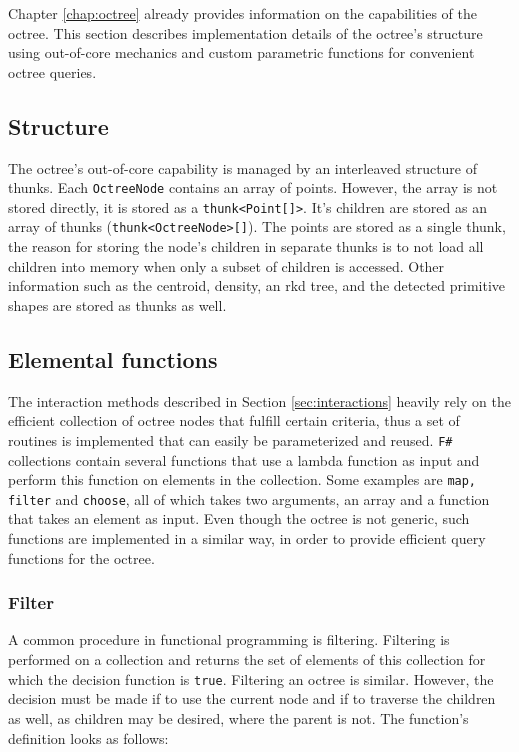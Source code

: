 Chapter \ref{chap:octree} already provides information on the capabilities of the octree. This section describes implementation details of the octree's structure using out-of-core mechanics and custom parametric functions for convenient octree queries. 


\subsection{Structure}

The octree's out-of-core capability is managed by an interleaved structure of thunks. Each \verb|OctreeNode| contains an array of points. However, the array is not stored directly, it is stored as a \verb|thunk<Point[]>|. It's children are stored as an array of thunks (\verb|thunk<OctreeNode>[]|). The points are stored as a single thunk, the reason for storing the node's children in separate thunks is to not load all children into memory when only a subset of children is accessed. Other information such as the centroid, density, an rkd tree, and the detected primitive shapes are stored as thunks as well. 


\subsection{Elemental functions}

The interaction methods described in Section \ref{sec:interactions} heavily rely on the efficient collection of octree nodes that fulfill certain criteria, thus a set of routines is implemented that can easily be parameterized and reused. \verb|F#| collections contain several functions that use a lambda function as input and perform this function on elements in the collection. Some examples are \verb|map, filter| and \verb|choose|, all of which takes two arguments, an array and a function that takes an element as input. Even though the octree is not generic, such functions are implemented in a similar way, in order to provide efficient query functions for the octree. 


\subsubsection{Filter}

A common procedure in functional programming is filtering. Filtering is performed on a collection and returns the set of elements of this collection for which the decision function is \verb|true|. Filtering an octree is similar. However, the decision must be made if to use the current node and if to traverse the children as well, as children may be desired, where the parent is not. 
The function's definition looks as follows: 

